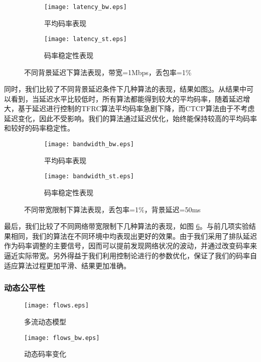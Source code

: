         \begin{figure}[htbp]
          \begin{subfigure}[b]{0.5\textwidth}
            \centering
            \texttt{[image: latency\_bw.eps]}
            \caption{平均码率表现}
            \label{pic:latency_bw}
          \end{subfigure}
          \begin{subfigure}[b]{0.5\textwidth}
            \centering
            \texttt{[image: latency\_st.eps]}
            \caption{码率稳定性表现}
            \label{pic:latency_st}
          \end{subfigure}
          \caption{不同背景延迟下算法表现，带宽=1Mbps，丢包率=1\%}
          \label{pic:latency}
        \end{figure}

        同时，我们比较了不同背景延迟条件下几种算法的表现，结果如图\ref{pic:latency}。从结果中可以看到，当延迟水平比较低时，所有算法都能得到较大的平均码率，随着延迟增大，基于延迟进行控制的TFRC算法平均码率急剧下降，而CTCP算法由于不考虑延迟变化，因此不受影响。我们的算法通过延迟优化，始终能保持较高的平均码率和较好的码率稳定性。

        \begin{figure}[htbp]
          \begin{subfigure}[b]{0.5\textwidth}
            \centering
            \texttt{[image: bandwidth\_bw.eps]}
            \caption{平均码率表现}
            \label{pic:bandwidth_bw}
          \end{subfigure}
          \begin{subfigure}[b]{0.5\textwidth}
            \centering
            \texttt{[image: bandwidth\_st.eps]}
            \caption{码率稳定性表现}
            \label{pic:bandwidth_st}
          \end{subfigure}
          \caption{不同带宽限制下算法表现，丢包率=1\%，背景延迟=50ms}
          \label{pic:bandwidth}
        \end{figure}

        最后，我们比较了不同网络带宽限制下几种算法的表现，如图 \ref{pic:bandwidth}。与前几项实验结果相同，我们的算法在不同环境中均表现出更好的效果。由于我们采用了排队延迟作为码率调整的主要信号，因而可以提前发现网络状况的波动，并通过改变码率来逼近实际带宽。另外得益于我们利用控制论进行的参数优化，保证了我们的码率自适应算法过程更加平滑、结果更加准确。

        \subsubsection{动态公平性}
        \begin{figure}[htbp]
          \centering
          \texttt{[image: flows.eps]}
          \caption{多流动态模型}
          \label{pic:flows}
        \end{figure}
        \begin{figure}[htbp]
          \centering
          \texttt{[image: flows\_bw.eps]}
          \caption{动态码率变化}
          \label{pic:flows_bw}
        \end{figure}

